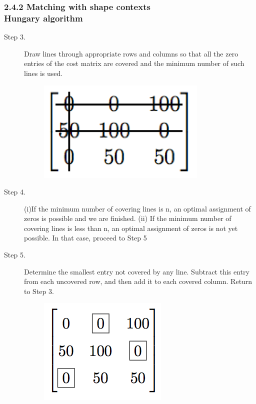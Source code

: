 \documentclass[notheorems,serif,table,compress]{beamer}  %
\begin{document}
\begin{frame}
\frametitle{2.4.2 Matching with shape contexts \\ \normalsize{Hungary algorithm}}
\begin{description}
    \item[\footnotesize{Step 3.}] \footnotesize{Draw lines through appropriate rows and columns so that all the zero entries of the cost matrix are covered and the minimum number of such lines is used.}
        \begin{figure}
        \includegraphics[width=0.24\linewidth]{3} 
        \end{figure}
    \item[Step 4.] \footnotesize{(i)If the minimum number of covering lines is n, an optimal assignment of zeros is possible and we are finished. (ii) If the minimum number of covering lines is less than n, an optimal assignment of zeros is not yet possible. In that case, proceed to Step 5}
    \item[Step 5.] \footnotesize{Determine the smallest entry not covered by any line. Subtract this entry from each uncovered row, and then add it to each covered column. Return to Step 3.}
              \begin{figure}
              \centering
              \begin{minipage}[t]{0.25\linewidth}
              \includegraphics[width=0.8\linewidth]{4}
              \end{minipage}

\end{figure}
\end{description}
\end{frame}
\end{document}
